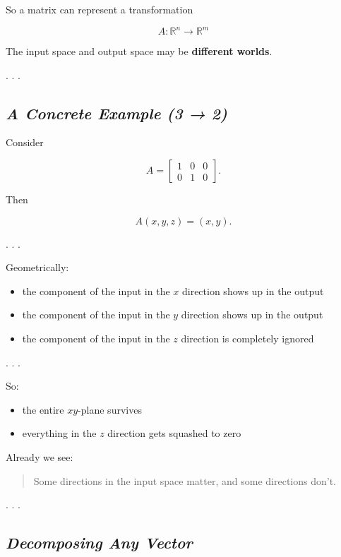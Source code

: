 \documentclass[
  letterpaper,
  DIV=11,
  numbers=noendperiod]{scrartcl}
\providecommand{\tightlist}{%
  \setlength{\itemsep}{0pt}\setlength{\parskip}{0pt}}\usepackage{longtable,booktabs,array}
\begin{document}
So a matrix can represent a transformation

\[
A: \mathbb{R}^n \to \mathbb{R}^m
\]

The input space and output space may be \textbf{different worlds}.

. . .

\subsection{\texorpdfstring{\emph{A Concrete Example (3 →
2)}}{A Concrete Example (3 → 2)}}\label{a-concrete-example-3-2}

Consider

\[
A =
\begin{bmatrix}
1 & 0 & 0\\
0 & 1 & 0
\end{bmatrix}.
\]

Then

\[
A(x,y,z) = (x,y).
\]

. . .

Geometrically:

\begin{itemize}
\tightlist
\item
  the component of the input in the \(x\) direction shows up in the
  output
\item
  the component of the input in the \(y\) direction shows up in the
  output
\item
  the component of the input in the \(z\) direction is completely
  ignored
\end{itemize}

. . .

So:

\begin{itemize}
\tightlist
\item
  the entire \(xy\)-plane survives
\item
  everything in the \(z\) direction gets squashed to zero
\end{itemize}

Already we see:

\begin{quote}
Some directions in the input space matter, and some directions don't.
\end{quote}

. . .

\subsection{\texorpdfstring{\emph{Decomposing Any
Vector}}{Decomposing Any Vector}}\label{decomposing-any-vector}
\end{document}
